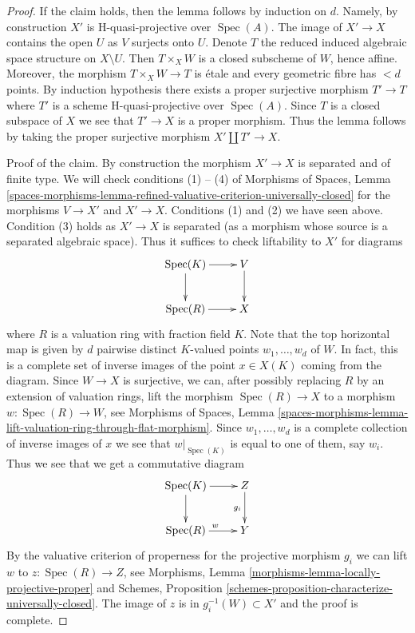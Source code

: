 \documentclass{stacks-project}
\theoremstyle{plain}
\theoremstyle{definition}
\theoremstyle{remark}
\numberwithin{equation}{subsection}
\def\Spec{\mathop{\mathrm{Spec}}}
\begin{document}
\begin{proof}
\medskip\noindent
If the claim holds, then the lemma follows by induction on $d$.
Namely, by construction $X'$ is H-quasi-projective over $\Spec(A)$.
The image of $X' \to X$ contains the open $U$ as $V$ surjects onto $U$.
Denote $T$ the reduced induced algebraic space structure on $X \setminus U$.
Then $T \times_X W$ is a closed subscheme of $W$, hence affine.
Moreover, the morphism $T \times_X W \to T$ is \'etale and every geometric
fibre has $< d$ points. By induction hypothesis there exists a proper
surjective morphism $T' \to T$ where $T'$ is a scheme H-quasi-projective
over $\Spec(A)$. Since $T$ is a closed subspace of $X$ we see that
$T' \to X$ is a proper morphism. Thus the lemma follows by taking the
proper surjective morphism $X' \amalg T' \to X$.

\medskip\noindent
Proof of the claim. By construction the morphism $X' \to X$ is separated
and of finite type. We will check conditions (1) -- (4) of
Morphisms of Spaces, Lemma
\ref{spaces-morphisms-lemma-refined-valuative-criterion-universally-closed}
for the morphisms $V \to X'$ and $X' \to X$.
Conditions (1) and (2) we have seen above.
Condition (3) holds as $X' \to X$ is separated (as a morphism whose
source is a separated algebraic space). Thus it suffices to check
liftability to $X'$ for diagrams
$$
\xymatrix{
\Spec(K) \ar[r] \ar[d] & V \ar[d] \\
\Spec(R) \ar[r] & X
}
$$
where $R$ is a valuation ring with fraction field $K$.
Note that the top horizontal map is given by $d$ pairwise distinct
$K$-valued points $w_1, \ldots, w_d$ of $W$. In fact, this
is a complete set of inverse images of the point $x \in X(K)$
coming from the diagram. Since $W \to X$ is surjective,
we can, after possibly replacing $R$ by an extension of valuation rings,
lift the morphism $\Spec(R) \to X$ to a morphism $w : \Spec(R) \to W$, see
Morphisms of Spaces, Lemma
\ref{spaces-morphisms-lemma-lift-valuation-ring-through-flat-morphism}.
Since $w_1, \ldots, w_d$ is a complete collection of inverse images of
$x$ we see that $w|_{\Spec(K)}$ is equal to one of them, say $w_i$.
Thus we see that we get a commutative diagram
$$
\xymatrix{
\Spec(K) \ar[r] \ar[d] &  Z \ar[d]_{g_i}\\
\Spec(R) \ar[r]^w & Y
}
$$
By the valuative criterion of properness for the projective
morphism $g_i$ we can lift $w$ to $z : \Spec(R) \to Z$, see
Morphisms, Lemma \ref{morphisms-lemma-locally-projective-proper}
and
Schemes, Proposition \ref{schemes-proposition-characterize-universally-closed}.
The image of $z$ is in $g_i^{-1}(W) \subset X'$ and the proof is complete.
\end{proof}
\end{document}
